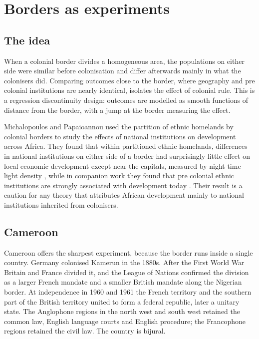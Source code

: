 \section{Borders as experiments}

\subsection{The idea}

When a colonial border divides a homogeneous area, the populations on either side were similar before colonisation and differ afterwards mainly in what the colonisers did. Comparing outcomes close to the border, where geography and pre colonial institutions are nearly identical, isolates the effect of colonial rule. This is a regression discontinuity design: outcomes are modelled as smooth functions of distance from the border, with a jump at the border measuring the effect.

Michalopoulos and Papaioannou used the partition of ethnic homelands by colonial borders to study the effects of national institutions on development across Africa. They found that within partitioned ethnic homelands, differences in national institutions on either side of a border had surprisingly little effect on local economic development except near the capitals, measured by night time light density \citep{michalopoulos2014}, while in companion work they found that pre colonial ethnic institutions are strongly associated with development today \citep{michalopoulos2013}. Their result is a caution for any theory that attributes African development mainly to national institutions inherited from colonisers.

\subsection{Cameroon}

Cameroon offers the sharpest experiment, because the border runs inside a single country. Germany colonised Kamerun in the 1880s. After the First World War Britain and France divided it, and the League of Nations confirmed the division as a larger French mandate and a smaller British mandate along the Nigerian border. At independence in 1960 and 1961 the French territory and the southern part of the British territory united to form a federal republic, later a unitary state. The Anglophone regions in the north west and south west retained the common law, English language courts and English procedure; the Francophone regions retained the civil law. The country is bijural.

